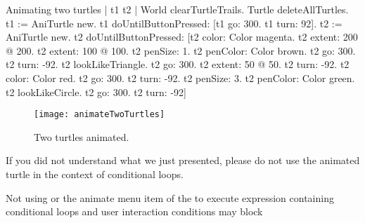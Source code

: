 \begin{scriptwithtitle}{Animating two turtles}\label{scr:twoturtles}
| t1 t2 |
World clearTurtleTrails.
Turtle deleteAllTurtles.
\bold{[}t1 := AniTurtle new.
t1
   doUntilButtonPressed: [t1 go: 300.
      t1 turn: 92]\bold{] fork}.
\bold{[}t2 := AniTurtle new.
t2
   doUntilButtonPressed: [t2 color: Color magenta.
      t2 extent: 200 @ 200.
      t2 extent: 100 @ 100.
      t2 penSize: 1.
      t2 penColor: Color brown.
      t2 go: 300.
      t2 turn: -92.
      t2 lookLikeTriangle.
      t2 go: 300.
      t2 extent: 50 @ 50.
      t2 turn: -92.
      t2 color: Color red.
      t2 go: 300.
      t2 turn: -92.
      t2 penSize: 3.
      t2 penColor: Color green.
      t2 lookLikeCircle.
      t2 go: 300.
       t2 turn: -92]\bold{] fork}
\end{scriptwithtitle}

\begin{figure}[h]
\begin{center}
\texttt{[image: animateTwoTurtles]}
\caption{Two turtles animated. \label{fig:twoTurtles}}
\end{center}
\end{figure}

\summa

If you did not understand what we just presented, please do not use the animated turtle in the context of conditional loops. 

Not using  or the animate menu item of the \tw to execute expression containing conditional loops and user interaction conditions may block \sq

\ifx\wholebook\relax\else\fi




